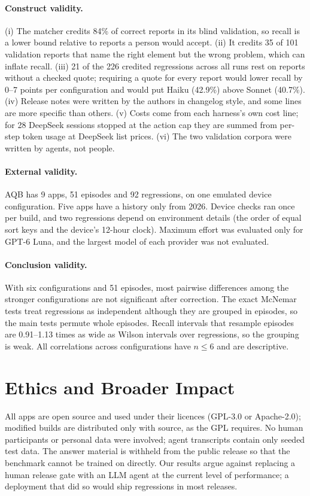 \documentclass[sigconf]{acmart}
\newcommand{\aqb}{AQB\xspace}
\begin{document}
\paragraph{Construct validity.}
(i) The matcher credits 84\% of correct reports in its blind validation, so recall is a lower bound
relative to reports a person would accept. (ii) It credits 35 of 101 validation reports that name the
right element but the wrong problem, which can inflate recall. (iii) 21 of the 226 credited
regressions across all runs rest on reports without a checked quote; requiring a quote for every
report would lower recall by 0--7 points per configuration and would put Haiku (42.9\%) above Sonnet
(40.7\%). (iv) Release notes were written by the authors in changelog style, and some lines are more
specific than others. (v) Costs come from each harness's own cost line; for 28 DeepSeek sessions
stopped at the action cap they are summed from per-step token usage at DeepSeek list prices. (vi) The
two validation corpora were written by agents, not people.

\paragraph{External validity.}
\aqb has 9 apps, 51 episodes and 92 regressions, on one emulated device configuration. Five apps have
a history only from 2026. Device checks ran once per build, and two regressions depend on environment
details (the order of equal sort keys and the device's 12-hour clock). Maximum effort was evaluated
only for GPT-6 Luna, and the largest model of each provider was not evaluated.

\paragraph{Conclusion validity.}
With six configurations and 51 episodes, most pairwise differences among the stronger configurations
are not significant after correction. The exact McNemar tests treat regressions as independent
although they are grouped in episodes, so the main tests permute whole episodes. Recall intervals that
resample episodes are 0.91--1.13 times as wide as Wilson intervals over regressions, so the grouping
is weak. All correlations across configurations have $n \le 6$ and are descriptive.

\section{Ethics and Broader Impact}
All apps are open source and used under their licences (GPL-3.0 or Apache-2.0); modified builds are
distributed only with source, as the GPL requires. No human participants or personal data were
involved; agent transcripts contain only seeded test data. The answer material is withheld from the
public release so that the benchmark cannot be trained on directly. Our results argue against
replacing a human release gate with an LLM agent at the current level of performance; a deployment
that did so would ship regressions in most releases.
\end{document}
